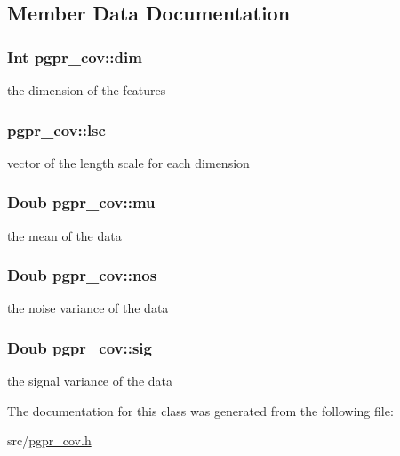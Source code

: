 \subsection{Member Data Documentation}
\hypertarget{classpgpr__cov_ab24ca5303c1a5e6865109a8e1ba32f0f}{
\subsubsection[{dim}]{\setlength{\rightskip}{0pt plus 5cm}Int pgpr\-\_\-cov\-::dim}}\label{classpgpr__cov_ab24ca5303c1a5e6865109a8e1ba32f0f}
the dimension of the features \hypertarget{classpgpr__cov_a43428fdb9c6278e5e2be3a4c60967b7b}{
\subsubsection[{lsc}]{ pgpr\-\_\-cov\-::lsc}}\label{classpgpr__cov_a43428fdb9c6278e5e2be3a4c60967b7b}
vector of the length scale for each dimension \hypertarget{classpgpr__cov_ad57517c36c587894616f19bd02025747}{
\subsubsection[{mu}]{\setlength{\rightskip}{0pt plus 5cm}Doub pgpr\-\_\-cov\-::mu}}\label{classpgpr__cov_ad57517c36c587894616f19bd02025747}
the mean of the data \hypertarget{classpgpr__cov_aca7d95563680510edbd84957b34da53c}{
\subsubsection[{nos}]{\setlength{\rightskip}{0pt plus 5cm}Doub pgpr\-\_\-cov\-::nos}}\label{classpgpr__cov_aca7d95563680510edbd84957b34da53c}
the noise variance of the data \hypertarget{classpgpr__cov_a57b97be1a56d01ba78bb58200cc66244}{
\subsubsection[{sig}]{\setlength{\rightskip}{0pt plus 5cm}Doub pgpr\-\_\-cov\-::sig}}\label{classpgpr__cov_a57b97be1a56d01ba78bb58200cc66244}
the signal variance of the data 

The documentation for this class was generated from the following file\-:\begin{DoxyCompactItemize}
\item 
src/\hyperlink{pgpr__cov_8h}{pgpr\-\_\-cov.\-h}\end{DoxyCompactItemize}
